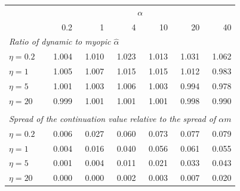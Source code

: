 \begin{tabular}{lrrrrrr}
 & \multicolumn{6}{c}{$\alpha$} \\
 & 0.2 & 1 & 4 & 10 & 20 & 40 \\
\hline\hline
\multicolumn{7}{l}{\emph{Ratio of dynamic to myopic $\hat\alpha$}} \\
$\eta=0.2$ & 1.004 & 1.010 & 1.023 & 1.013 & 1.031 & 1.062 \\
$\eta=1$ & 1.005 & 1.007 & 1.015 & 1.015 & 1.012 & 0.983 \\
$\eta=5$ & 1.001 & 1.003 & 1.006 & 1.003 & 0.994 & 0.978 \\
$\eta=20$ & 0.999 & 1.001 & 1.001 & 1.001 & 0.998 & 0.990 \\
\\[-0.5ex]
\multicolumn{7}{l}{\emph{Spread of the continuation value relative to the spread of $\alpha m$}} \\
$\eta=0.2$ & 0.006 & 0.027 & 0.060 & 0.073 & 0.077 & 0.079 \\
$\eta=1$ & 0.004 & 0.016 & 0.040 & 0.056 & 0.061 & 0.055 \\
$\eta=5$ & 0.001 & 0.004 & 0.011 & 0.021 & 0.033 & 0.043 \\
$\eta=20$ & 0.000 & 0.000 & 0.002 & 0.003 & 0.007 & 0.020 \\
\hline
\end{tabular}
